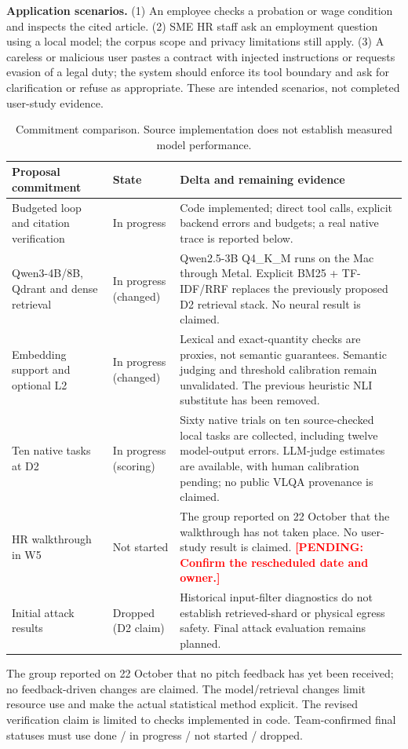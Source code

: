 \documentclass[a4paper,11pt]{article}
\newcommand{\hdr}[1]{\vspace{2pt}\noindent\textbf{#1}}
\newcommand{\pending}[1]{\textcolor{red}{\textbf{[PENDING: #1]}}}
\begin{document}
\hdr{Application scenarios.} (1) An employee checks a probation or wage condition and inspects the cited article. (2) SME HR staff ask an employment question using a local model; the corpus scope and privacy limitations still apply. (3) A careless or malicious user pastes a contract with injected instructions or requests evasion of a legal duty; the system should enforce its tool boundary and ask for clarification or refuse as appropriate. These are intended scenarios, not completed user-study evidence.

\begin{table}[H]\centering\footnotesize
\begin{tabularx}{\textwidth}{@{}L{3.1cm}L{2.0cm}X@{}}
\toprule Proposal commitment & State & Delta and remaining evidence\\\midrule
Budgeted loop and citation verification & In progress & Code implemented; direct tool calls, explicit backend errors and budgets; a real native trace is reported below.\\
Qwen3-4B/8B, Qdrant and dense retrieval & In progress (changed) & Qwen2.5-3B Q4\_K\_M runs on the Mac through Metal. Explicit BM25 + TF-IDF/RRF replaces the previously proposed D2 retrieval stack. No neural result is claimed.\\
Embedding support and optional L2 & In progress (changed) & Lexical and exact-quantity checks are proxies, not semantic guarantees. Semantic judging and threshold calibration remain unvalidated. The previous heuristic NLI substitute has been removed.\\
Ten native tasks at D2 & In progress (scoring) & Sixty native trials on ten source-checked local tasks are collected, including twelve model-output errors. LLM-judge estimates are available, with human calibration pending; no public VLQA provenance is claimed.\\
HR walkthrough in W5 & Not started & The group reported on 22 October that the walkthrough has not taken place. No user-study result is claimed. \pending{Confirm the rescheduled date and owner.}\\
Initial attack results & Dropped (D2 claim) & Historical input-filter diagnostics do not establish retrieved-shard or physical egress safety. Final attack evaluation remains planned.\\
\bottomrule\end{tabularx}
\caption{Commitment comparison. Source implementation does not establish measured model performance.}
\end{table}
The group reported on 22 October that no pitch feedback has yet been received; no feedback-driven changes are claimed.
The model/retrieval changes limit resource use and make the actual statistical method explicit. The revised verification claim is limited to checks implemented in code. Team-confirmed final statuses must use done / in progress / not started / dropped.
\end{document}
